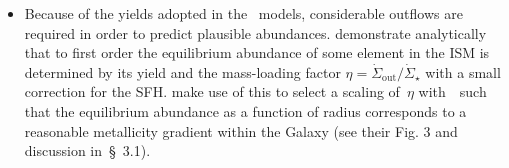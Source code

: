 \documentclass[ms.tex]{subfiles}
\begin{document}
\begin{itemize}
	\item Because of the yields adopted in the~\citet{Johnson2021} models, 
	considerable outflows are required in order to predict plausible abundances. 
	\citet{Weinberg2017} demonstrate analytically that to first order the 
	equilibrium abundance of some element in the ISM is determined by its yield 
	and the mass-loading factor 
	$\eta = \dot{\Sigma}_\text{out}/\dot{\Sigma}_\star$ with a small 
	correction for the SFH. 
	\citet{Johnson2021} make use of this to select a scaling of~$\eta$ 
	with~\rgal~such that the equilibrium abundance as a function of radius 
	corresponds to a reasonable metallicity gradient within the Galaxy (see 
	their Fig. 3 and discussion in~\S~3.1). 

\end{itemize} 
\end{document}
